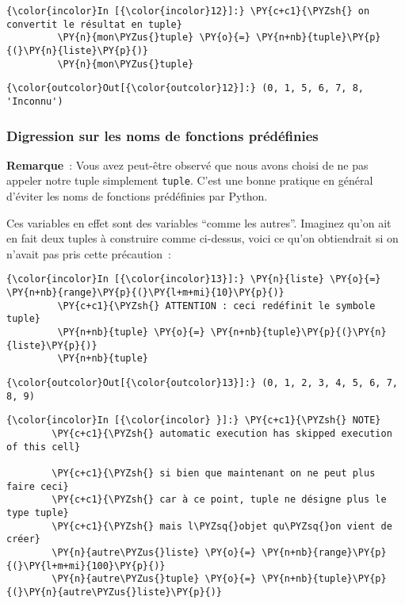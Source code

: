     \begin{Verbatim}[commandchars=\\\{\}]
{\color{incolor}In [{\color{incolor}12}]:} \PY{c+c1}{\PYZsh{} on convertit le résultat en tuple}
         \PY{n}{mon\PYZus{}tuple} \PY{o}{=} \PY{n+nb}{tuple}\PY{p}{(}\PY{n}{liste}\PY{p}{)}
         \PY{n}{mon\PYZus{}tuple}
\end{Verbatim}


\begin{Verbatim}[commandchars=\\\{\}]
{\color{outcolor}Out[{\color{outcolor}12}]:} (0, 1, 5, 6, 7, 8, 'Inconnu')
\end{Verbatim}
            
    \hypertarget{digression-sur-les-noms-de-fonctions-pruxe9duxe9finies}{%
\subsubsection{Digression sur les noms de fonctions
prédéfinies}\label{digression-sur-les-noms-de-fonctions-pruxe9duxe9finies}}

    \textbf{Remarque}~: Vous avez peut-être observé que nous avons choisi de
ne pas appeler notre tuple simplement \texttt{tuple}. C'est une bonne
pratique en général d'éviter les noms de fonctions prédéfinies par
Python.

Ces variables en effet sont des variables ``comme les autres''. Imaginez
qu'on ait en fait deux tuples à construire comme ci-dessus, voici ce
qu'on obtiendrait si on n'avait pas pris cette précaution~:

    \begin{Verbatim}[commandchars=\\\{\}]
{\color{incolor}In [{\color{incolor}13}]:} \PY{n}{liste} \PY{o}{=} \PY{n+nb}{range}\PY{p}{(}\PY{l+m+mi}{10}\PY{p}{)}
         \PY{c+c1}{\PYZsh{} ATTENTION : ceci redéfinit le symbole tuple}
         \PY{n+nb}{tuple} \PY{o}{=} \PY{n+nb}{tuple}\PY{p}{(}\PY{n}{liste}\PY{p}{)}
         \PY{n+nb}{tuple}
\end{Verbatim}


\begin{Verbatim}[commandchars=\\\{\}]
{\color{outcolor}Out[{\color{outcolor}13}]:} (0, 1, 2, 3, 4, 5, 6, 7, 8, 9)
\end{Verbatim}
            
    \begin{Verbatim}[commandchars=\\\{\}]
{\color{incolor}In [{\color{incolor} }]:} \PY{c+c1}{\PYZsh{} NOTE}
        \PY{c+c1}{\PYZsh{} automatic execution has skipped execution of this cell}
        
        \PY{c+c1}{\PYZsh{} si bien que maintenant on ne peut plus faire ceci}
        \PY{c+c1}{\PYZsh{} car à ce point, tuple ne désigne plus le type tuple}
        \PY{c+c1}{\PYZsh{} mais l\PYZsq{}objet qu\PYZsq{}on vient de créer}
        \PY{n}{autre\PYZus{}liste} \PY{o}{=} \PY{n+nb}{range}\PY{p}{(}\PY{l+m+mi}{100}\PY{p}{)}
        \PY{n}{autre\PYZus{}tuple} \PY{o}{=} \PY{n+nb}{tuple}\PY{p}{(}\PY{n}{autre\PYZus{}liste}\PY{p}{)}
\end{Verbatim}


